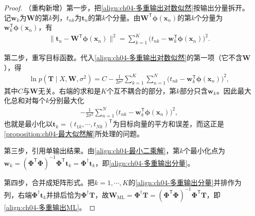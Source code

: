 \documentclass[../../main.tex]{subfiles}
\begin{document}
\begin{proof}
（重构新增）第一步，把\eqref{align:ch04-多重输出对数似然}按输出分量拆开。记$\boldsymbol{w}_k$为$\boldsymbol{W}$的第$k$列，$t_{nk}$为$\boldsymbol{t}_n$的第$k$个分量。由$\boldsymbol{W}^{\mathsf{T}}\boldsymbol{\phi}(\boldsymbol{x}_n)$的第$k$个分量为$\boldsymbol{w}_k^{\mathsf{T}}\boldsymbol{\phi}(\boldsymbol{x}_n)$，有
\begin{align*}
  \bigl\|\boldsymbol{t}_n-\boldsymbol{W}^{\mathsf{T}}\boldsymbol{\phi}(\boldsymbol{x}_n)\bigr\|^2
  =\sum_{k=1}^{K}\bigl(t_{nk}-\boldsymbol{w}_k^{\mathsf{T}}\boldsymbol{\phi}(\boldsymbol{x}_n)\bigr)^2 .
\end{align*}

第二步，重写目标函数。代入\eqref{align:ch04-多重输出对数似然}的第一项（它不含$\boldsymbol{W}$），得
\begin{align*}
  \ln p(\boldsymbol{T}\mid X,\boldsymbol{W},\sigma^2)
  =C-\frac{1}{2\sigma^2}\sum_{k=1}^{K}\sum_{n=1}^{N}\bigl(t_{nk}-\boldsymbol{w}_k^{\mathsf{T}}\boldsymbol{\phi}(\boldsymbol{x}_n)\bigr)^2,
\end{align*}
其中$C$与$\boldsymbol{W}$无关。右端的求和是$K$个互不耦合的部分，第$k$部分只含$\boldsymbol{w}_k$。因此最大化总和对每个$k$分别最大化
\begin{align*}
  -\frac{1}{2\sigma^2}\sum_{n=1}^{N}\bigl(t_{nk}-\boldsymbol{w}_k^{\mathsf{T}}\boldsymbol{\phi}(\boldsymbol{x}_n)\bigr)^2,
\end{align*}
也就是最小化以$\boldsymbol{t}_k=(t_{1k},\cdots,t_{Nk})^{\mathsf{T}}$为目标向量的平方和误差，而这正是\cref{proposition:ch04-最大似然解}所处理的问题。

第三步，引用单输出结果。由\eqref{align:ch04-最小二乘解}，第$k$个最小化点为$\boldsymbol{w}_k=(\boldsymbol{\Phi}^{\mathsf{T}}\boldsymbol{\Phi})^{-1}\boldsymbol{\Phi}^{\mathsf{T}}\boldsymbol{t}_k=\boldsymbol{\Phi}^{\dagger}\boldsymbol{t}_k$，即\eqref{align:ch04-多重输出分量}。

第四步，合并成矩阵形式。把$k=1,\cdots,K$的\eqref{align:ch04-多重输出分量}并排作为列，右端$\boldsymbol{\Phi}^{\dagger}\boldsymbol{t}_k$并排后恰为$\boldsymbol{\Phi}^{\dagger}\boldsymbol{T}$，故$\boldsymbol{W}_{\mathrm{ML}}=\boldsymbol{\Phi}^{\dagger}\boldsymbol{T}=(\boldsymbol{\Phi}^{\mathsf{T}}\boldsymbol{\Phi})^{-1}\boldsymbol{\Phi}^{\mathsf{T}}\boldsymbol{T}$，即\eqref{align:ch04-多重输出ML}。
\end{proof}
\end{document}
